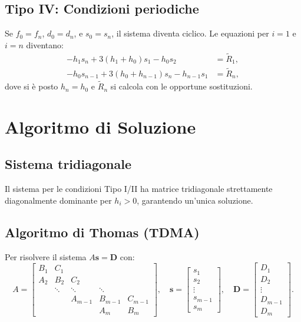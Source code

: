 \documentclass[12pt]{article}
\begin{document}
\subsection{Tipo IV: Condizioni periodiche}
Se $f_0 = f_n$, $d_0 = d_n$, e $s_0 = s_n$, il sistema diventa ciclico. Le equazioni per $i=1$ e $i=n$ diventano:
\[
\begin{aligned}
- h_1 s_n + 3(h_1 + h_0) s_1 - h_0 s_2 &= \tilde{R}_1, \\
- h_0 s_{n-1} + 3(h_0 + h_{n-1}) s_n - h_{n-1} s_1 &= \tilde{R}_n,
\end{aligned}
\]
dove si è posto $h_n = h_0$ e $\tilde{R}_n$ si calcola con le opportune sostituzioni.

\section{Algoritmo di Soluzione}

\subsection{Sistema tridiagonale}
Il sistema per le condizioni Tipo I/II ha matrice tridiagonale strettamente diagonalmente dominante per $h_i > 0$, garantendo un'unica soluzione.

\subsection{Algoritmo di Thomas (TDMA)}
Per risolvere il sistema $A\bm{s} = \bm{D}$ con:
\[
A = \begin{bmatrix}
B_1 & C_1 & & & \\
A_2 & B_2 & C_2 & & \\
& \ddots & \ddots & \ddots & \\
& & A_{m-1} & B_{m-1} & C_{m-1} \\
& & & A_m & B_m
\end{bmatrix}, \quad \bm{s} = \begin{bmatrix} s_1 \\ s_2 \\ \vdots \\ s_{m-1} \\ s_m \end{bmatrix}, \quad \bm{D} = \begin{bmatrix} D_1 \\ D_2 \\ \vdots \\ D_{m-1} \\ D_m \end{bmatrix}.
\]
\end{document}
